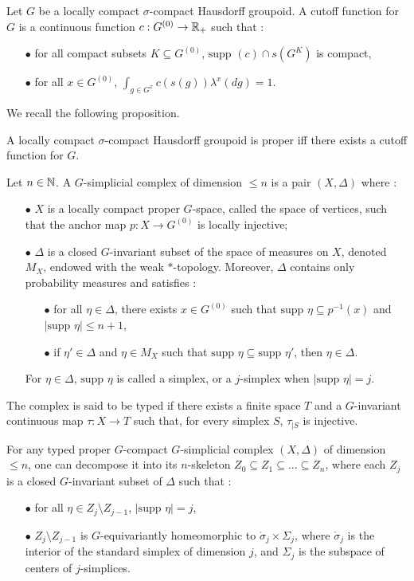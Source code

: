 Let $G$ be a locally compact $\sigma$-compact Hausdorff groupoid. A cutoff function for $G$ is a continuous function $c : G^{(0)} \rightarrow \mathbb R_+$ such that :
\begin{itemize}
\item[$\bullet$] for all compact subsets $K\subseteq G^{(0)}$, $\text{supp }(c)\cap s(G^K)$ is compact,
\item[$\bullet$] for all $x\in G^{(0)}$, $\int_{g\in G^x} c(s(g)) \lambda^x(dg) = 1$.
\end{itemize}

We recall the following proposition.

\begin{prop}
A locally compact $\sigma$-compact Hausdorff groupoid is proper iff there exists a cutoff function for $G$. 
\end{prop}

\begin{definition} \label{Gcomplex}
Let $n\in\mathbb N$. A $G$-simplicial complex of dimension $\leq n$ is a pair $(X,\Delta)$ where :
\begin{itemize}
\item[$\bullet$] $X$ is a locally compact proper $G$-space, called the space of vertices, such that the anchor map $p : X\rightarrow G^{(0)}$ is locally injective;
\item[$\bullet$] $\Delta$ is a closed $G$-invariant subset of the space of measures on $X$, denoted $M_X$, endowed with the weak $*$-topology. Moreover, $\Delta$ contains only probability measures and satisfies :
\begin{itemize}
\item[$\bullet$] for all $\eta\in\Delta$, there exists $x\in G^ {(0)}$ such that $\text{supp }\eta \subseteq p^{-1}(x)$ and $|\text{supp }\eta|\leq n+1$,
\item[$\bullet$] if $\eta' \in \Delta$ and $\eta\in M_X$ such that $\text{supp }\eta \subseteq \text{supp }\eta'$, then $\eta\in \Delta$.
\end{itemize}
For $\eta\in \Delta$, $\text{supp }\eta$ is called a simplex, or a $j$-simplex when $|\text{supp }\eta | = j$.
\end{itemize}
The complex is said to be typed if there exists a finite space $T$ and a $G$-invariant continuous map $\tau : X\rightarrow T$ such that, for every simplex $S$, $\tau_{|S}$ is injective.  
\end{definition}

For any typed proper $G$-compact $G$-simplicial complex $(X,\Delta)$ of dimension $\leq n$, one can decompose it into its $n$-skeleton $Z_0\subseteq Z_1 \subseteq ... \subseteq Z_n$, where each $Z_j$ is a closed $G$-invariant subset of $\Delta$ such that :
\begin{itemize}
\item[$\bullet$] for all $\eta \in Z_j \setminus Z_{j-1}$, $|\text{supp }\eta|= j$,
\item[$\bullet$] $Z_j \setminus Z_{j-1}$ is $G$-equivariantly homeomorphic to $\mathring\sigma_j \times \Sigma_j$, where $\mathring\sigma_j $ is the interior of the standard simplex of dimension $j$, and $\Sigma_j$ is the subspace of centers of $j$-simplices.
\end{itemize}


